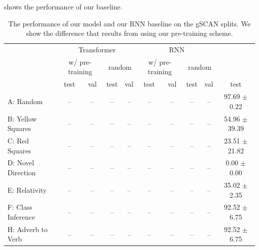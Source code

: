 \documentclass[11pt]{article}
\begin{document}
 shows the performance of our baseline.

\begin{table}
\begin{center}
\begin{tabularx}{\textwidth}{ l|ccccccccc }
\toprule
\multicolumn{1}{c}{} 
& \multicolumn{4}{c}{Transformer}  
& \multicolumn{4}{c}{RNN}  
& \\
\cmidrule{3-4}
\cmidrule{7-8}
\multicolumn{1}{c}{} 
& \multicolumn{2}{c}{w/ pre-training}  
& \multicolumn{2}{c}{random}
& \multicolumn{2}{c}{w/ pre-training}  
& \multicolumn{2}{c}{random}
& \multicolumn{1}{c}{\cite{ruis2020benchmark}}\\
& test  & val  & test &  val & test &  val & test & val & test  \\
\midrule
A: Random & --  & --  & -- &  -- & -- &  -- & -- &  -- & 97.69 $\pm$ 0.22\\
B: Yellow Squares & --  & --  & -- &  -- & -- &  -- & -- &  -- &  54.96 $\pm$ 39.39\\
C: Red Squares & --  & --  & -- &  -- & -- &  -- & -- &  -- & 23.51 $\pm$ 21.82\\
D: Novel Direction & --  & --  & -- & -- & -- &  -- & -- &  -- & 0.00 $\pm$ 0.00 \\
E: Relativity & --  & --  & -- & -- & -- &  -- & -- &  -- & 35.02 $\pm$ 2.35 \\
F: Class Inference & --  & --  & -- &  -- &-- &  -- & -- &  -- &  92.52 $\pm$ 6.75 \\
H: Adverb to Verb & --  & --  & -- &  -- &-- &  -- & -- &  -- &  92.52 $\pm$ 6.75 \\
\bottomrule
\end{tabularx}
\end{center}
\caption{The performance of our model and our RNN baseline on the gSCAN splits. We show the difference that results from using our pre-training scheme.}
\label{tab:gscan_results}
\end{table}
\end{document}
